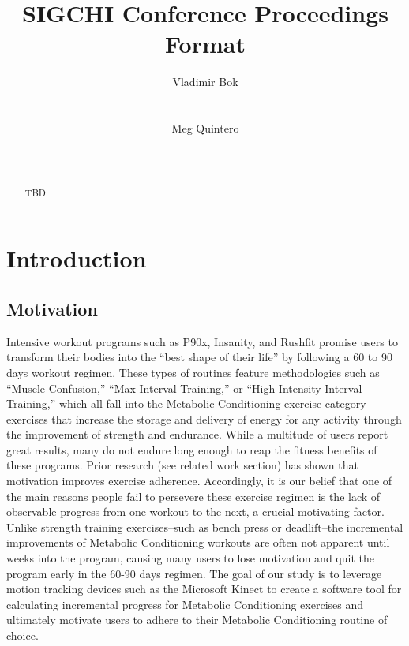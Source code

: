 \documentclass{sigchi}
\begin{document}
\title{SIGCHI Conference Proceedings Format}

\author{
  \alignauthor Vladimir Bok\\
    \\
    \\
  \alignauthor Meg Quintero\\
    \\
    \\
}

\maketitle

\begin{abstract}
TBD
\end{abstract}


\section{Introduction}
\subsection{Motivation}
Intensive workout programs such as P90x, Insanity, and Rushfit promise users to transform their bodies into the “best shape of their life” by following a 60 to 90 days workout regimen.  These types of routines feature methodologies such as “Muscle Confusion,” “Max Interval Training,” or “High Intensity Interval Training,” which all fall into the Metabolic Conditioning exercise category---exercises that increase the storage and delivery of energy for any activity through the improvement of strength and endurance.  While a multitude of users report great results, many do not endure long enough to reap the fitness benefits of these programs. Prior research (see related work section) has shown that motivation improves exercise adherence. Accordingly, it is our belief that one of the main reasons people fail to persevere these exercise regimen is the lack of observable progress from one workout to the next, a crucial motivating factor. Unlike strength training exercises--such as bench press or deadlift--the incremental improvements of Metabolic Conditioning workouts are often not apparent until weeks into the program, causing many users to lose motivation and quit the program early in the 60-90 days regimen. The goal of our study is to leverage motion tracking devices such as the Microsoft Kinect to create a software tool for calculating incremental progress for Metabolic Conditioning exercises and ultimately motivate users to adhere to their Metabolic Conditioning routine of choice.
\end{document}
